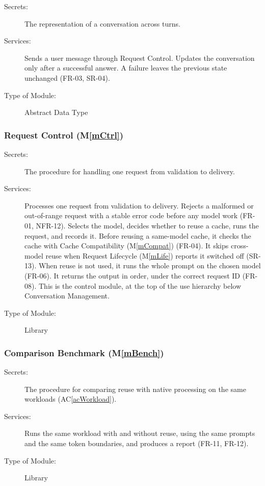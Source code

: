 \documentclass[12pt, titlepage]{article}
\newcommand{\acref}[1]{AC\ref{#1}}
\newcommand{\mref}[1]{M\ref{#1}}
\begin{document}
\begin{description}
\item[Secrets:] The representation of a conversation across turns.
\item[Services:] Sends a user message through Request Control. Updates the
  conversation only after a successful answer. A failure leaves the previous
  state unchanged (FR-03, SR-04).
\item[Type of Module:] Abstract Data Type
\end{description}

\subsubsection{Request Control (\mref{mCtrl})}

\begin{description}
\item[Secrets:] The procedure for handling one request from validation to delivery.
\item[Services:] Processes one request from validation to delivery. Rejects a
  malformed or out-of-range request with a stable error code before any model
  work (FR-01, NFR-12). Selects the model, decides whether to reuse a cache, runs
  the request, and records it. Before reusing a same-model cache, it checks the
  cache with Cache Compatibility (\mref{mCompat}) (FR-04). It skips cross-model
  reuse when Request Lifecycle (\mref{mLife}) reports it switched off (SR-13).
  When reuse is not used, it runs the whole prompt
  on the chosen model (FR-06). It returns the output in order, under the correct
  request ID (FR-08). This is the control module, at the top of the use
  hierarchy below Conversation Management.
\item[Type of Module:] Library
\end{description}

\subsubsection{Comparison Benchmark (\mref{mBench})}

\begin{description}
\item[Secrets:] The procedure for comparing reuse with native processing on the same workloads (\acref{acWorkload}).
\item[Services:] Runs the same workload with and without reuse, using the same
  prompts and the same token boundaries, and produces a report (FR-11, FR-12).
\item[Type of Module:] Library
\end{description}
\end{document}
